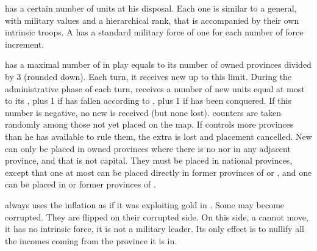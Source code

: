 \aparag[Pashas]\label{chSpecific:Turkey:Pashas}
\TUR has a certain number of \Pasha units at his disposal.  Each one
is similar to a general, with military values and a hierarchical rank,
that is accompanied by their own intrinsic troops. A \Pasha has a
standard military force of one \Timar \LD for each number of force
increment.

 \TUR has a maximal number of \Pashas in play
equals to its number of owned provinces divided by 3 (rounded down).
Each turn, it receives new \Pashas up to this limit.
\bparag During the administrative phase of each turn, \TUR receives a
number of new \Pasha units equal at most to its \STAB, plus 1 if
 has fallen according to , plus
1 if  has been conquered. If this number is negative, no
new \Pasha is received (but none lost).
\bparag \Pasha counters are taken randomly among those not yet placed
on the map.
\bparag If \TUR controls more provinces than he has available \Pashas
to rule them, the extra is lost and placement cancelled.
 New \Pashas can only be placed in owned
provinces where there is no \Pasha nor in any adjacent province, and
that is not \TUR capital. They must be placed in \TUR national
provinces, except that one at most can be placed directly in former
provinces of  or , and one can be placed in
 or former provinces of .

\bparag \TUR always uses the inflation as if it was exploiting gold in
.
\bparag Some \Pashas may become corrupted. They are flipped on their
corrupted side. On this side, a \Pasha cannot move, it has no intrinsic
force, it is not a military leader. Its only effect is to nullify all
the incomes coming from the province it is in.

